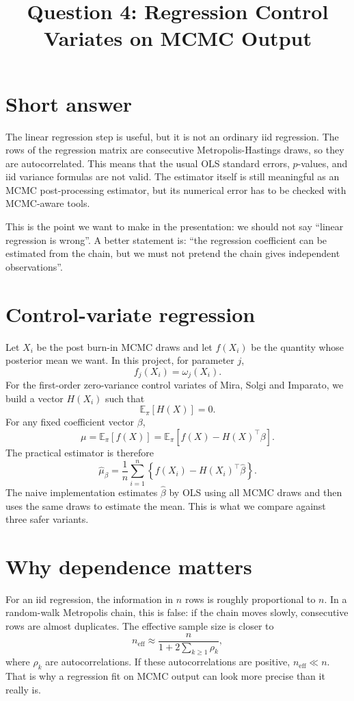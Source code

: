 \documentclass[11pt]{article}
\title{Question 4: Regression Control Variates on MCMC Output}
\author{}
\date{}
\begin{document}
\maketitle

\section*{Short answer}

The linear regression step is useful, but it is not an ordinary iid regression.  The rows of the regression matrix are consecutive Metropolis-Hastings draws, so they are autocorrelated.  This means that the usual OLS standard errors, \(p\)-values, and iid variance formulas are not valid.  The estimator itself is still meaningful as an MCMC post-processing estimator, but its numerical error has to be checked with MCMC-aware tools.

This is the point we want to make in the presentation: we should not say ``linear regression is wrong''.  A better statement is: ``the regression coefficient can be estimated from the chain, but we must not pretend the chain gives independent observations''.

\section*{Control-variate regression}

Let \(X_i\) be the post burn-in MCMC draws and let \(f(X_i)\) be the quantity whose posterior mean we want.  In this project, for parameter \(j\),
\[
  f_j(X_i)=\omega_j(X_i).
\]
For the first-order zero-variance control variates of Mira, Solgi and Imparato, we build a vector \(H(X_i)\) such that
\[
  \mathbb E_\pi[H(X)] = 0.
\]
For any fixed coefficient vector \(\beta\),
\[
  \mu
  =
  \mathbb E_\pi[f(X)]
  =
  \mathbb E_\pi[f(X)-H(X)^\top\beta].
\]
The practical estimator is therefore
\[
  \widehat\mu_\beta
  =
  \frac1n\sum_{i=1}^n
  \left\{f(X_i)-H(X_i)^\top\widehat\beta\right\}.
\]
The naive implementation estimates \(\widehat\beta\) by OLS using all MCMC draws and then uses the same draws to estimate the mean.  This is what we compare against three safer variants.

\section*{Why dependence matters}

For an iid regression, the information in \(n\) rows is roughly proportional to \(n\).  In a random-walk Metropolis chain, this is false: if the chain moves slowly, consecutive rows are almost duplicates.  The effective sample size is closer to
\[
  n_{\mathrm{eff}}
  \approx
  \frac{n}{1+2\sum_{k\ge1}\rho_k},
\]
where \(\rho_k\) are autocorrelations.  If these autocorrelations are positive, \(n_{\mathrm{eff}}\ll n\).  That is why a regression fit on MCMC output can look more precise than it really is.
\end{document}
